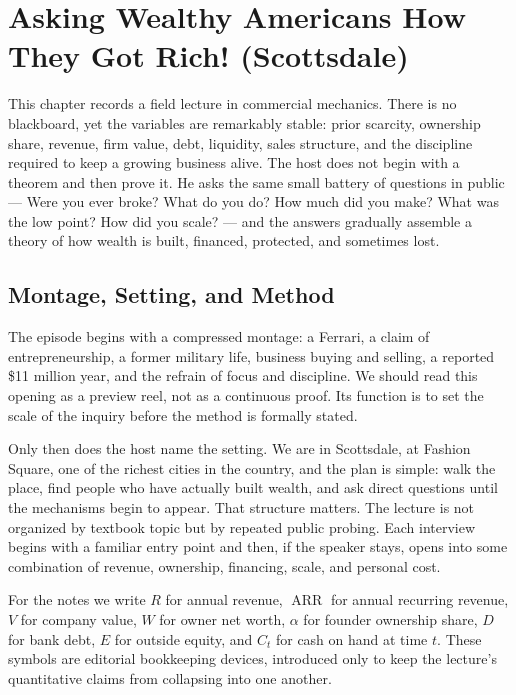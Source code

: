 \chapter{Asking Wealthy Americans How They Got Rich! (Scottsdale)}

This chapter records a field lecture in commercial mechanics. There is no blackboard, yet the variables are remarkably stable: prior scarcity, ownership share, revenue, firm value, debt, liquidity, sales structure, and the discipline required to keep a growing business alive. The host does not begin with a theorem and then prove it. He asks the same small battery of questions in public --- Were you ever broke? What do you do? How much did you make? What was the low point? How did you scale? --- and the answers gradually assemble a theory of how wealth is built, financed, protected, and sometimes lost.

\section{Montage, Setting, and Method}

The episode begins with a compressed montage: a Ferrari, a claim of entrepreneurship, a former military life, business buying and selling, a reported \$11 million year, and the refrain of focus and discipline. We should read this opening as a preview reel, not as a continuous proof. Its function is to set the scale of the inquiry before the method is formally stated.

Only then does the host name the setting. We are in Scottsdale, at Fashion Square, one of the richest cities in the country, and the plan is simple: walk the place, find people who have actually built wealth, and ask direct questions until the mechanisms begin to appear. That structure matters. The lecture is not organized by textbook topic but by repeated public probing. Each interview begins with a familiar entry point and then, if the speaker stays, opens into some combination of revenue, ownership, financing, scale, and personal cost.

\begin{definition}
For the notes we write $R$ for annual revenue, $\operatorname{ARR}$ for annual recurring revenue, $V$ for company value, $W$ for owner net worth, $\alpha$ for founder ownership share, $D$ for bank debt, $E$ for outside equity, and $C_t$ for cash on hand at time $t$. These symbols are editorial bookkeeping devices, introduced only to keep the lecture's quantitative claims from collapsing into one another.
\end{definition}

